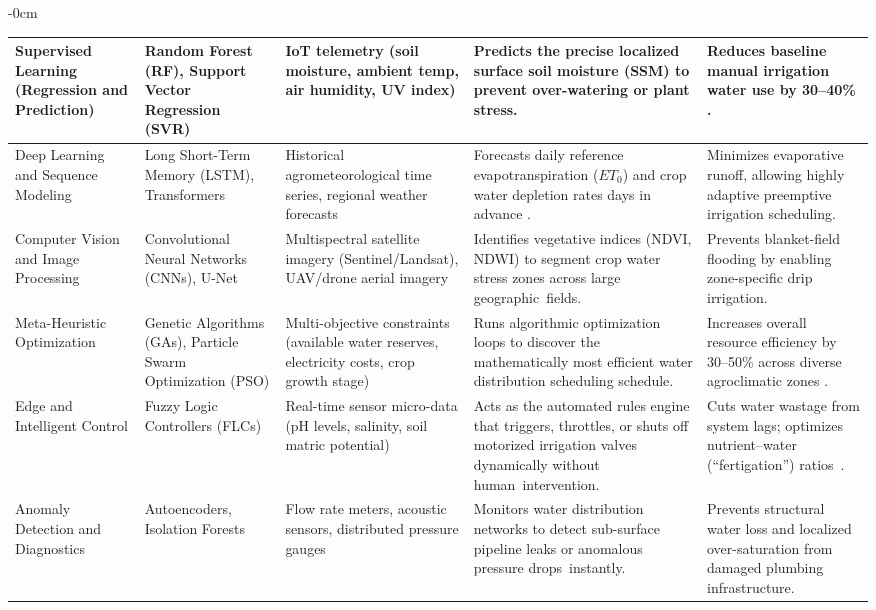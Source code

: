 \documentclass[land,review,accept,pdftex,oneauthor]{Definitions/mdpi}
\begin{document}
\begin{table}[H]
\begin{adjustwidth}{-\extralength}{0cm}
\begin{minipage}{\fulllength}
\begin{tabularx}{\textwidth}{m{2.6cm}<{\raggedright}m{3cm}<{\raggedright}m{3.5cm}<{\raggedright}m{4cm}<{\raggedright}m{3.5cm}<{\raggedright}}
Supervised Learning (Regression and Prediction) & 
Random Forest (RF), Support Vector Regression (SVR) & 
IoT telemetry (soil moisture, ambient temp, air humidity, UV index) & 
Predicts the precise localized surface soil moisture (SSM) to prevent over-watering or plant stress. & 
Reduces baseline manual irrigation water use by 30--40\% \citep{Oguzturk2025}. \\
\midrule
Deep Learning and Sequence Modeling & 
Long Short-Term Memory (LSTM), Transformers & 
Historical agrometeorological time series, regional weather forecasts & 
Forecasts daily reference evapotranspiration ($ET_0$) and crop water depletion rates days in advance \citep{Zhang2025}. & 
Minimizes evaporative runoff, allowing highly adaptive preemptive irrigation scheduling. \\ 
\midrule
Computer Vision and Image Processing & 
Convolutional Neural Networks (CNNs), U-Net & 
Multispectral satellite imagery (Sentinel/Landsat), UAV/drone aerial imagery \citep{Yparraguirre2026} & 
Identifies vegetative indices (NDVI, NDWI) to segment crop water stress zones across large geographic~fields. & 
Prevents blanket-field flooding by enabling zone-specific drip irrigation. \\ 
\midrule
Meta-Heuristic Optimization & 
Genetic Algorithms (GAs), Particle Swarm Optimization (PSO) & 
Multi-objective constraints (available water reserves, electricity costs, crop growth stage)~\citep{Paria2025} & 
Runs algorithmic optimization loops to discover the mathematically most efficient water distribution scheduling schedule. & 
Increases overall resource efficiency by 30--50\% across diverse agroclimatic zones \citep{Hamdouni2026}. \\ 
\midrule
Edge and Intelligent Control & 
Fuzzy Logic Controllers (FLCs) & 
Real-time sensor micro-data (pH levels, salinity, soil matric potential) \citep{Ali2025} & 
Acts as the automated rules engine that triggers, throttles, or shuts off motorized irrigation valves dynamically without human~intervention. & 
Cuts water wastage from system lags; optimizes nutrient--water (``fertigation'') ratios~\citep{Oguzturk2025}. \\ 
\midrule
Anomaly Detection and Diagnostics & 
Autoencoders, Isolation Forests & 
Flow rate meters, acoustic sensors, distributed pressure gauges \citep{w18080919} & 
Monitors water distribution networks to detect sub-surface pipeline leaks or anomalous pressure drops~instantly. & 
Prevents structural water loss and localized over-saturation from damaged plumbing infrastructure. \\

\bottomrule
\end{tabularx}
\end{minipage}
\end{adjustwidth}
\end{table}
\end{document}
